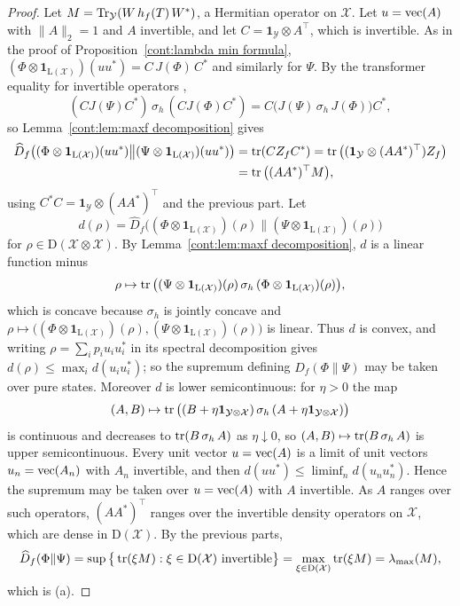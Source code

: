 \begin{proof}
 Let $M=\operatorname{Tr}_{\mathcal{Y}}(W\,h_f(T)\,W^*)$, a Hermitian operator on $\mathcal{X}$. Let
$u=\operatorname{vec}(A)$ with $\|A\|_2=1$ and $A$ invertible, and let $C=\mathbf{1}_{\mathcal{Y}}\otimes A^\top$, which is
invertible. As in the proof of Proposition~\ref{cont:lambda min formula},
$(\Phi\otimes\mathbf{1}_{\mathrm{L}(\mathcal{X})})(uu^*)=C\,J(\Phi)\,C^*$ and similarly for $\Psi$. By the transformer equality
for invertible operators \cite{KuboAndo1980},
\[
(CJ(\Psi)C^*)\,\sigma_h\,(CJ(\Phi)C^*)=C\big(J(\Psi)\,\sigma_h\,J(\Phi)\big)C^*,
\]
so Lemma~\ref{cont:lem:maxf decomposition} gives
\begin{align*}
\widehat{D}_f\big((\Phi\otimes\mathbf{1}_{\mathrm{L}(\mathcal{X})})(uu^*)\big\|(\Psi\otimes\mathbf{1}_{\mathrm{L}(\mathcal{X})})(uu^*)\big)
&=\operatorname{tr}(CZ_fC^*)=\operatorname{tr}\big((\mathbf{1}_{\mathcal{Y}}\otimes(AA^*)^\top)Z_f\big)\\
&=\operatorname{tr}\big((AA^*)^\top M\big),
\end{align*}
using $C^*C=\mathbf{1}_{\mathcal{Y}}\otimes(AA^*)^\top$ and the previous part. 
 Let
\[
d(\rho)=\widehat{D}_f\big((\Phi\otimes\mathbf{1}_{\mathrm{L}(\mathcal{X})})(\rho)\big\|(\Psi\otimes\mathbf{1}_{\mathrm{L}(\mathcal{X})})(\rho)\big)
\]
for
$\rho\in \mathrm{D}(\mathcal{X}\otimes\mathcal{X})$. By Lemma~\ref{cont:lem:maxf decomposition}, $d$ is a linear function minus
\[
\rho\mapsto\operatorname{tr}\big((\Psi\otimes\mathbf{1}_{\mathrm{L}(\mathcal{X})})(\rho)\,\sigma_h\,(\Phi\otimes\mathbf{1}_{\mathrm{L}(\mathcal{X})})(\rho)\big),
\]
which is concave because
$\sigma_h$ is jointly concave \cite{KuboAndo1980} and $\rho\mapsto\big((\Phi\otimes\mathbf{1}_{\mathrm{L}(\mathcal{X})})(\rho),(\Psi\otimes\mathbf{1}_{\mathrm{L}(\mathcal{X})})(\rho)\big)$
is linear. Thus $d$ is convex, and writing $\rho=\sum_ip_iu_iu_i^*$ in its spectral decomposition gives
$d(\rho)\leq\max_id(u_iu_i^*)$; so the supremum defining $\widehat{D}_f(\Phi\|\Psi)$ may be taken over pure states.
Moreover $d$ is lower semicontinuous: for $\eta>0$ the map
\[
(A,B)\mapsto\operatorname{tr}\big((B+\eta\mathbf{1}_{\mathcal{Y}\otimes\mathcal{X}})\,\sigma_h\,(A+\eta\mathbf{1}_{\mathcal{Y}\otimes\mathcal{X}})\big)
\]
is continuous and decreases to $\operatorname{tr}(B\,\sigma_h\,A)$ as $\eta\downarrow0$, so $(A,B)\mapsto\operatorname{tr}(B\,\sigma_h\,A)$ is upper
semicontinuous. Every unit vector $u=\operatorname{vec}(A)$ is a limit of unit vectors $u_n=\operatorname{vec}(A_n)$ with $A_n$
invertible, and then $d(uu^*)\leq\liminf_nd(u_nu_n^*)$. Hence the supremum may be taken over $u=\operatorname{vec}(A)$ with
$A$ invertible. As $A$ ranges over such operators, $(AA^*)^\top$ ranges over the invertible density operators on
$\mathcal{X}$, which are dense in $\mathrm{D}(\mathcal{X})$. By the previous parts,
\[
\widehat{D}_f(\Phi\|\Psi)=\sup\big\{\operatorname{tr}(\xi M):\xi\in \mathrm{D}(\mathcal{X})\ \text{invertible}\big\}
=\max_{\xi\in \mathrm{D}(\mathcal{X})}\operatorname{tr}(\xi M)=\lambda_{\max}(M),
\]
which is (a).
 

\end{proof}

